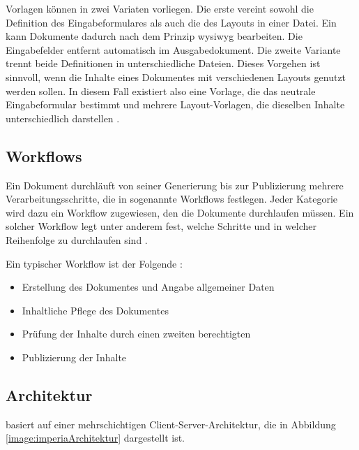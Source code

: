             Vorlagen können in zwei Variaten vorliegen.
            Die erste vereint sowohl die Definition des Eingabeformulares
            als auch die des Layouts in einer Datei.
            Ein {\editor} kann Dokumente dadurch nach dem Prinzip \gls{wysiwyg} bearbeiten.
            Die Eingabefelder entfernt {\imperia} automatisch im Ausgabedokument.
            Die zweite Variante trennt beide Definitionen in unterschiedliche Dateien.
            Dieses Vorgehen ist sinnvoll, wenn die Inhalte eines Dokumentes mit
            verschiedenen Layouts genutzt werden sollen.
            In diesem Fall existiert also eine Vorlage,
            die das neutrale Eingabeformular bestimmt
            und mehrere Layout-Vorlagen, die dieselben Inhalte unterschiedlich darstellen
            \cite[Kapitel 36]{imperia:ecmd}.

        \subsection{Workflows}
            Ein Dokument durchläuft von seiner Generierung bis zur
            Publizierung mehrere Verarbeitungsschritte,
            die in {\imperia} sogenannte Workflows festlegen.
            Jeder Kategorie wird dazu ein Workflow zugewiesen,
            den die Dokumente durchlaufen müssen.
            Ein solcher Workflow legt unter anderem fest,
            welche Schritte und in welcher Reihenfolge
            zu durchlaufen sind
            \cite[Kapitel 1.1.5]{imperia:ecmd}.

            Ein typischer Workflow ist der Folgende
            \cite[Kapitel 1.1]{imperia:ecmd}:

            \begin{itemize}
                \item Erstellung des Dokumentes und Angabe allgemeiner Daten
                \item Inhaltliche Pflege des Dokumentes
                \item Prüfung der Inhalte durch einen zweiten berechtigten \editor
                \item Publizierung der Inhalte
            \end{itemize}

        \subsection{Architektur}
            \label{section:imperiaArch}
            {\imperia} basiert auf einer mehrschichtigen Client-Server-Architektur,
            die in Abbildung \ref{image:imperiaArchitektur} dargestellt ist.

